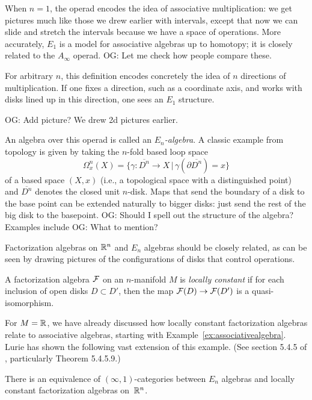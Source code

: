 \documentclass[11pt]{amsart}
\def\mcol{\, | \,}
\def\owen#1{{\textcolor{violet!65!black}{OG: {#1}}}}
\begin{document}
When $n = 1$, the operad encodes the idea of associative multiplication:
we get pictures much like those we drew earlier with intervals, 
except that now we can slide and stretch the intervals because we have a space of operations.
More accurately, $E_1$ is a model for associative algebras up to homotopy; 
it is closely related to the $A_\infty$ operad. \owen{Let me check how people compare these.}

For arbitrary $n$, this definition encodes concretely the idea of $n$ directions of multiplication.
If one fixes a direction, such as a coordinate axis, and works with disks lined up in this direction,
one sees an $E_1$ structure.

\owen{Add picture? We drew 2d pictures earlier.}

An algebra over this operad is called an {\em $E_n$-algebra}.
A classic example from topology is given by taking the $n$-fold based loop space
\[
\Omega^n_x(X) = \{ \gamma: \overline{D^n} \to X \mcol \gamma(\partial \overline{D^n}) = x\}
\]
of a based space $(X,x)$ (i.e., a topological space with a distinguished point) and $\overline{D^n}$ denotes the closed unit $n$-disk.
Maps that send the boundary of a disk to the base point can be extended naturally to bigger disks: just send the rest of the big disk to the basepoint.
\owen{Should I spell out the structure of the algebra?}
Examples include \owen{What to mention?}

Factorization algebras on $\mathbb R^n$ and $E_n$ algebras should be closely related,
as can be seen by drawing pictures of the configurations of disks that control operations.

\begin{dfn}
A factorization algebra $\mathcal F$ on an $n$-manifold $M$ is \emph{locally constant} if for each inclusion of open disks $D \subset D'$, then the map $\mathcal F(D) \to \mathcal F(D')$ is a quasi-isomorphism.
\end{dfn}

For $M = \mathbb R$, we have already discussed how locally constant factorization algebras relate to associative algebras, starting with Example~\ref{ex:associativealgebra}.
Lurie has shown the following vast extension of this example. (See section 5.4.5 of \cite{LurieHA}, particularly Theorem 5.4.5.9.)

\begin{thm}\label{thm:locisen}
There is an equivalence of $(\infty,1)$-categories between $E_n$ algebras and locally constant factorization algebras on~$\mathbb R^n$.  
\end{thm}  
\end{document}
